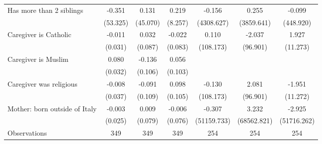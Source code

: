 {\begin{tabular}{l*{6}{c}}
\addlinespace
Has more than 2 siblings&      -0.351         &       0.131         &       0.219         &      -0.156         &       0.255         &      -0.099         \\
                    &    (53.325)         &    (45.070)         &     (8.257)         &  (4308.627)         &  (3859.641)         &   (448.920)         \\
\addlinespace
Caregiver is Catholic&      -0.011         &       0.032         &      -0.022         &       0.110         &      -2.037         &       1.927         \\
                    &     (0.031)         &     (0.087)         &     (0.083)         &   (108.173)         &    (96.901)         &    (11.273)         \\
\addlinespace
Caregiver is Muslim&       0.080\sym{*}  &      -0.136         &       0.056         &                &                &                \\
                    &     (0.032)         &     (0.106)         &     (0.103)         &                 &                 &               \\
\addlinespace
Caregiver was religious&      -0.008         &      -0.091         &       0.098         &      -0.130         &       2.081         &      -1.951         \\
                    &     (0.037)         &     (0.109)         &     (0.105)         &   (108.173)         &    (96.901)         &    (11.272)         \\
\addlinespace
Mother: born outside of Italy&      -0.003         &       0.009         &      -0.006         &      -0.307         &       3.232         &      -2.925         \\
                    &     (0.025)         &     (0.079)         &     (0.076)         & (51159.733)         & (68562.821)         & (51716.262)         \\
\midrule
Observations        &         349         &         349         &         349         &         254         &         254         &         254         \\
\bottomrule
\end{tabular}
}
